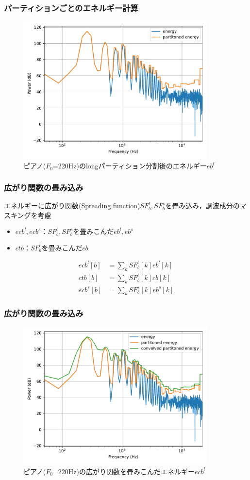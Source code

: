 \documentclass[14pt,xcolor=dvipsnames,table,dvipdfmx]{beamer}
\begin{document}
\begin{frame}[c]
    \frametitle{パーティションごとのエネルギー計算}
    \begin{figure}
        \includegraphics[width=100mm]{./figs/psyco_analyze_partitioned_energy.pdf}
        \caption*{ピアノ($F_{0}$=220Hz)のlongパーティション分割後のエネルギー$eb^{l}$}
    \end{figure}
\end{frame}

\begin{frame}[c]
    \frametitle{広がり関数の畳み込み}
    エネルギーに広がり関数(Spreading function)$SF^{l}_{b}, SF^{s}_{b}$を畳み込み，調波成分のマスキングを考慮
    \begin{itemize}
        \item $ecb^{l}, ecb^{s}$：$SF^{l}_{b}, SF^{s}_{b}$を畳みこんだ$eb^{l}, eb^{s}$
        \item $ctb$：$SF^{l}_{b}$を畳みこんだ$cb$
    \end{itemize}
    \begin{align}
        ecb^{l}[b] &= \sum_{k} SF^{l}_{b}[k] eb^{l}[k] \\
        ctb[b] &= \sum_{k} SF^{l}_{b}[k] cb[k] \\
        ecb^{s}[b] &= \sum_{k} SF^{s}_{b}[k] eb^{s}[k]
    \end{align}
\end{frame}

\begin{frame}[c]
    \frametitle{広がり関数の畳み込み}
    \begin{figure}
        \includegraphics[width=100mm]{./figs/psyco_analyze_convolved_partitioned_energy.pdf}
        \caption*{ピアノ($F_{0}$=220Hz)の広がり関数を畳みこんだエネルギー$ecb^{l}$}
    \end{figure}
\end{frame}
\end{document}
